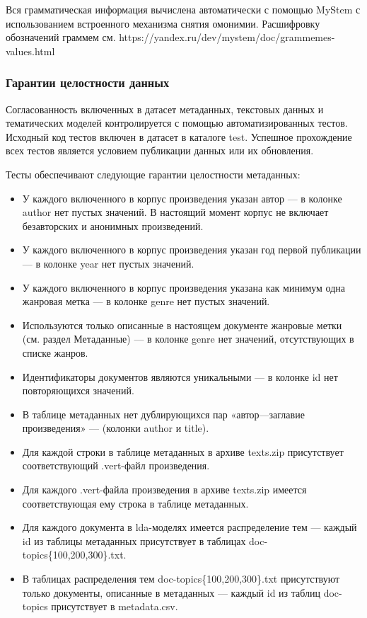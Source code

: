 \documentclass[
]{article}
\providecommand{\tightlist}{%
  \setlength{\itemsep}{0pt}\setlength{\parskip}{0pt}}
\begin{document}
Вся грамматическая информация вычислена автоматически с помощью MyStem с
использованием встроенного механизма снятия омонимии. Расшифровку
обозначений граммем см.
https://yandex.ru/dev/mystem/doc/grammemes-values.html

\hypertarget{ux433ux430ux440ux430ux43dux442ux438ux438-ux446ux435ux43bux43eux441ux442ux43dux43eux441ux442ux438-ux434ux430ux43dux43dux44bux445}{%
\subsubsection{Гарантии целостности
данных}\label{ux433ux430ux440ux430ux43dux442ux438ux438-ux446ux435ux43bux43eux441ux442ux43dux43eux441ux442ux438-ux434ux430ux43dux43dux44bux445}}

Согласованность включенных в датасет метаданных, текстовых данных и
тематических моделей контролируется с помощью автоматизированных тестов.
Исходный код тестов включен в датасет в каталоге test. Успешное
прохождение всех тестов является условием публикации данных или их
обновления.

Тесты обеспечивают следующие гарантии целостности метаданных:

\begin{itemize}
\tightlist
\item
  У каждого включенного в корпус произведения указан автор --- в колонке
  author нет пустых значений. В настоящий момент корпус не включает
  безавторских и анонимных произведений.
\item
  У каждого включенного в корпус произведения указан год первой
  публикации --- в колонке year нет пустых значений.
\item
  У каждого включенного в корпус произведения указана как минимум одна
  жанровая метка --- в колонке genre нет пустых значений.
\item
  Используются только описанные в настоящем документе жанровые метки
  (см. раздел Метаданные) --- в колонке genre нет значений,
  отсутствующих в списке жанров.
\item
  Идентификаторы документов являются уникальными --- в колонке id нет
  повторяющихся значений.
\item
  В таблице метаданных нет дублирующихся пар «автор---заглавие
  произведения» --- (колонки author и title).
\item
  Для каждой строки в таблице метаданных в архиве texts.zip присутствует
  соответствующий .vert-файл произведения.
\item
  Для каждого .vert-файла произведения в архиве texts.zip имеется
  соответствующая ему строка в таблице метаданных.
\item
  Для каждого документа в lda-моделях имеется распределение тем ---
  каждый id из таблицы метаданных присутствует в таблицах
  doc-topics\{100,200,300\}.txt.
\item
  В таблицах распределения тем doc-topics\{100,200,300\}.txt
  присутствуют только документы, описанные в метаданных --- каждый id из
  таблиц doc-topics присутствует в metadata.csv.
\end{itemize}
\end{document}
